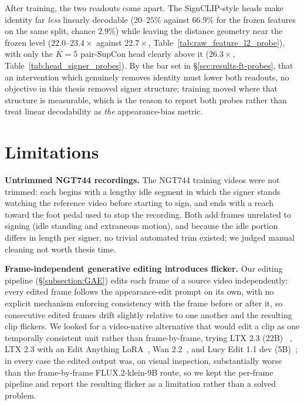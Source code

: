 After training, the two readouts come apart. The SignCLIP-style heads
make identity far \emph{less} linearly decodable ($20$--$25\%$ against
$66.9\%$ for the frozen features on the same split, chance $2.9\%$)
while leaving the distance geometry near the frozen level
($22.0$--$23.4\times$ against $22.7\times$,
Table~\ref{tab:raw_feature_l2_probe}), with only the $K{=}5$ pair-SupCon
head clearly above it ($26.3\times$,
Table~\ref{tab:head_signer_probes}). By the bar set in
\S\ref{sec:results-ft-probes}, that an intervention which genuinely
removes identity must lower both readouts, no objective in this thesis
removed signer structure; training moved where that structure is
measurable, which is the reason to report both probes rather than treat
linear decodability as \emph{the} appearance-bias metric.

\section{Limitations}
\label{sec:limitations}

\textbf{Untrimmed NGT744 recordings.} The NGT744 training videos were not
trimmed: each begins with a lengthy idle segment in which the signer
stands watching the reference video before starting to sign, and ends
with a reach toward the foot pedal used to stop the recording. Both add
frames unrelated to signing (idle standing and extraneous motion),
and because the idle portion differs in length per signer, no trivial
automated trim existed; we judged manual cleaning not worth thesis time.

\textbf{Frame-independent generative editing introduces flicker.} Our
editing pipeline (\S\ref{subsection:GAE}) edits each frame of a
source video independently: every edited frame follows the appearance-edit
prompt on its own, with no explicit mechanism enforcing consistency with
the frame before or after it, so consecutive edited frames drift slightly
relative to one another and the resulting clip flickers. We looked for a
video-native alternative that would edit a clip as one temporally
consistent unit rather than frame-by-frame, trying LTX 2.3 (22B)
~\cite{hacohen2026ltx2}, LTX 2.3 with an Edit Anything
LoRA~\cite{alissonerdx2026editanything}, Wan
2.2~\cite{wan2025}, and Lucy Edit 1.1 dev
(5B)~\cite{decart2025lucyedit};
in every case the edited
output was, on visual inspection, substantially worse than the
frame-by-frame FLUX.2-klein-9B route, so we
kept the per-frame pipeline and report the resulting flicker as a
limitation rather than a solved problem.


